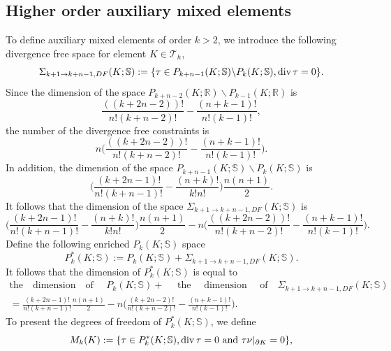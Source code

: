 \documentclass{amsart}
\numberwithin{table}{section}
\numberwithin{figure}{section}
\begin{document}
\subsection{Higher order auxiliary mixed  elements}
To define auxiliary mixed elements of order $k>2$,  we  introduce the following divergence free space for element $K\in \mathcal{T}_h$,
 \begin{equation}
 \Sigma_{k+1\rightarrow k+n-1, DF}(K; \mathbb{S}):=\{\tau\in P_{k+n-1}(K; \mathbb{S})\backslash P_k(K; \mathbb{S}), \operatorname{div} \tau=0 \}.
 \end{equation}
Since the dimension of the space $P_{k+n-2}(K; \mathbb{R})\backslash P_{k-1}(K; \mathbb{R})$ is
$$
\frac{((k+2n-2))!}{n!(k+n-2)!}-\frac{(n+k-1)!}{n!(k-1)!},
$$
the number of the divergence free constraints is
$$
n\bigg(\frac{((k+2n-2))!}{n!(k+n-2)!}-\frac{(n+k-1)!}{n!(k-1)!}\bigg).
$$
In addition,  the dimension of the space $P_{k+n-1}(K; \mathbb{S})\backslash P_k(K; \mathbb{S})$ is
$$
\bigg( \frac{(k+2n-1)!}{n!(k+n-1)!}-\frac{(n+k)!}{k!n!}\bigg)\frac{n(n+1)}{2}.
$$
It follows that the dimension of the space $\Sigma_{k+1\rightarrow k+n-1, DF}(K; \mathbb{S})$ is
 \begin{equation}
\bigg( \frac{(k+2n-1)!}{n!(k+n-1)!}-\frac{(n+k)!}{k!n!}\bigg)\frac{n(n+1)}{2}-n\bigg(\frac{((k+2n-2))!}{n!(k+n-2)!}-\frac{(n+k-1)!}{n!(k-1)!}\bigg).
 \end{equation}
Define the following enriched $P_k(K; \mathbb{S})$  space
  \begin{equation}
  P_k^\ast(K; \mathbb{S}):=P_k(K; \mathbb{S})+\Sigma_{k+1\rightarrow k+n-1, DF}(K; \mathbb{S}).
  \end{equation}
   It follows that the dimension of $P_k^\ast(K; \mathbb{S})$ is equal to
   \begin{equation}\label{eq3.15}
   \begin{split}
    \text{the~~ dimension~~ of ~~~}P_k(K; \mathbb{S})+ \text{~~~ the~~~ dimension~~~ of~~ }\Sigma_{k+1\rightarrow k+n-1, DF}(K; \mathbb{S})\\
    =  \frac{(k+2n-1)!}{n!(k+n-1)!}\frac{n(n+1)}{2}-n\bigg(\frac{(k+2n-2)!}{n!(k+n-2)!}-\frac{(n+k-1)!}{n!(k-1)!}\bigg).
   \end{split}
   \end{equation}
  To  present the degrees of freedom of  $P_k^\ast(K; \mathbb{S})$, we define
  \begin{equation}
    M_k(K):=\{\tau\in P_k^\ast(K;  \mathbb{S}), \operatorname{div}\tau=0 \text{ and }\tau\nu|_{\partial K}=0 \},
  \end{equation}
\end{document}
